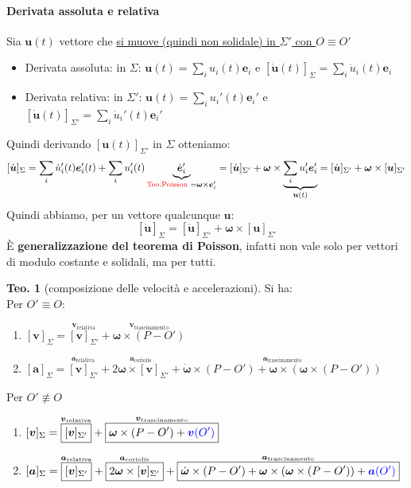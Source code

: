 \documentclass[a4paper,10pt]{article}
\theoremstyle{definition}
\newcommand{\bv}{\boldsymbol} %
\theoremstyle{indentdefinition}
\theoremstyle{indenttheorem}
\newtheorem{thm}{Teo.}
\theoremstyle{myremark}
\theoremstyle{indentgeneral}
\begin{document}
\paragraph{Derivata assoluta e relativa}
Sia $\bv{u}(t)$ vettore che \underline{si muove (quindi non solidale) in $\Sigma'$ con $O\equiv O'$}
\begin{itemize}
    \item Derivata assoluta: in $\Sigma$: $\bv{u}(t)=\sum_iu_i(t)\bv{e}_i$ e  $[\dot{\bv{u}}(t)]_\Sigma=\sum_i\dot{u}_i(t)\bv{e}_i$
    \item Derivata relativa: in $\Sigma'$: $\bv{u}(t)=\sum_iu_i'(t)\bv{e}_i'$ e  $[\dot{\bv{u}}(t)]_{\Sigma'}=\sum_i\dot{u}_i'(t)\bv{e}_i'$
\end{itemize}
Quindi derivando $[\bv{u}(t)]_{\Sigma'}$ in $\Sigma$ otteniamo:
$$[\dot{\bv{u}}]_\Sigma=\sum_i\dot{u}_i'(t)\bv{e}_i'(t)+\sum_iu_i'(t)\underbrace{\dot{\bv{e}}_i'}_{\text{\textcolor{red}{Teo.Poisson }}=\bv{\omega}\times\bv{e}_i'}=[\dot{\bv{u}}]_{\Sigma'}+\bv{\omega}\times\underbrace{\sum_iu_i'\bv{e}_i'}_{\bv{u}(t)}=[\dot{\bv{u}}]_{\Sigma'}+\bv{\omega}\times[\bv{u}]_{\Sigma'}$$
Quindi abbiamo, per un vettore qualcunque $\bv{u}$:
$$\boxed{[\dot{\bv{u}}]_\Sigma=[\dot{\bv{u}}]_{\Sigma'}+\bv{\omega}\times[\bv{u}]_{\Sigma'}}$$
È \textbf{generalizzazione del teorema di Poisson}, infatti non vale solo per vettori di modulo costante e solidali, ma per tutti.


\begin{thm}[composizione delle velocità e accelerazioni] Si ha: \\
Per $O'\equiv O$:
\begin{enumerate}
    \item $[{\bv{v}}]_\Sigma=\overset{\bv{v}_{\text{relativa}}}{\boxed{[{\bv{v}}]_{\Sigma'}}}+\overset{\bv{v}_{\text{trascinamento}}}{\boxed{{\bv{\omega}\times(P-O')}}}$
    \item $[{\bv{a}}]_\Sigma=\overset{\bv{a}_{\text{relativa}}}{\boxed{[{\bv{v}}]_{\Sigma'}}}+\overset{\bv{a}_{\text{coriolis}}}{\boxed{2\bv{\omega}\times[\bv{v}]_{\Sigma'}}}+\overset{\bv{a}_{\text{trascinamento}}}{\boxed{\dot{\bv{\omega}}\times(P-O')+\bv{\omega}\times(\bv{\omega}\times(P-O'))}}$

\end{enumerate}
Per $O'\not\equiv O$
\begin{enumerate}
\item $[{\bv{v}}]_\Sigma=\overset{\bv{v}_{\text{relativa}}}{\boxed{[{\bv{v}}]_{\Sigma'}}}+\overset{\bv{v}_{\text{trascinamento}}}{\boxed{{\bv{\omega}\times(P-O')}+\textcolor{blue}{\bv{v}(O')}}}$
    \item $[{\bv{a}}]_\Sigma=\overset{\bv{a}_{\text{relativa}}}{\boxed{[{\bv{v}}]_{\Sigma'}}}+\overset{\bv{a}_{\text{coriolis}}}{\boxed{2\bv{\omega}\times[\bv{v}]_{\Sigma'}}}+\overset{\bv{a}_{\text{trascinamento}}}{\boxed{\dot{\bv{\omega}}\times(P-O')+\bv{\omega}\times(\bv{\omega}\times(P-O'))+\textcolor{blue}{\bv{a}(O')}}}$
\end{enumerate}
\end{thm}
\end{document}
